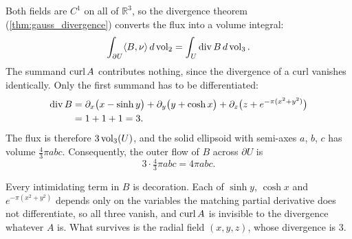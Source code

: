\begin{exercisesolution}
\label{sol:examHS24_KP1_part2_flux}
Both fields are $C^1$ on all of $\mathbb{R}^3$, so the divergence theorem
(\cref{thm:gauss_divergence}) converts the flux into a volume integral:
\[\int_{\partial U} \langle B, \nu\rangle \, d\operatorname{vol}_2 = \int_U \operatorname{div} B \, d\operatorname{vol}_3 .\]
The summand $\operatorname{curl} A$ contributes nothing, since the divergence of a curl vanishes identically.
Only the first summand has to be differentiated:
\begin{align*}
  \operatorname{div} B &= \partial_x\big(x - \sinh y\big) + \partial_y\big(y + \cosh x\big)
             + \partial_z\big(z + e^{-\pi(x^2+y^2)}\big) \\
          &= 1 + 1 + 1 = 3 .
\end{align*}
The flux is therefore $3\operatorname{vol}_3(U)$, and the solid ellipsoid with semi-axes $a$, $b$, $c$ has volume
$\tfrac43\pi abc$. Consequently, the outer flow of $B$ across $\partial U$ is
\[3 \cdot \tfrac43\pi abc = 4\pi abc .\]
\begin{remark}
Every intimidating term in $B$ is decoration. Each of $\sinh y$, $\cosh x$ and
$e^{-\pi(x^2+y^2)}$ depends only on the variables the matching partial derivative does not
differentiate, so all three vanish, and $\operatorname{curl} A$ is invisible to the divergence whatever $A$ is.
What survives is the radial field $(x,y,z)$, whose divergence is $3$.
\end{remark}
\end{exercisesolution}

